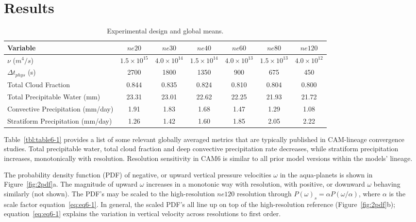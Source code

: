 \section{Results}

 \begin{table}
 \caption{Experimental design and global means.}
 \centering
 \scriptsize
 \begin{tabular}{lcccccc}
   \hline
   Variable & $ne20$ & $ne30$ & $ne40$ & $ne60$ & $ne80$ & $ne120$ \\
   \hline
   $\nu$ ($m^4/s$) & $1.5 \times 10^{15}$ & $4.0 \times 10^{14}$ & $1.5 \times 10^{14}$ & $4.0 \times 10^{13}$  & $1.5 \times 10^{13}$ & $4.0 \times 10^{12}$\\
    $\Delta t_{phys}$ (s) & 2700 & 1800 & 1350 & 900 & 675 & 450 \\
   Total Cloud Fraction & 0.844 & 0.835 & 0.824 & 0.810 & 0.804 & 0.800 \\ 
   Total Precipitable Water (mm) & 23.31& 23.01 & 22.62 & 22.25 & 21.93 & 21.72 \\
   Convective Precipitation (mm/day) & 1.91 & 1.83 & 1.68 & 1.47 & 1.29 & 1.08 \\
   Stratiform Precipitation (mm/day) & 1.26 & 1.42 & 1.60 & 1.85 & 2.05 & 2.22 \\      
 \hline
 \end{tabular}
 \label{tbl:table1}
 \end{table}

Table~\ref{tbl:table6-1} provides a list of some relevant globally averaged metrics that are typically published in CAM-lineage convergence studies. Total precipitable water, total cloud fraction and deep convective precipitation rate decreases, while stratiform precipitation increases, monotonically with resolution. Resolution sensitivity in CAM6 is similar to all prior model versions within the models' lineage. 

The probability density function (PDF) of negative, or upward vertical pressure velocities $\omega$ in the aqua-planets is shown in Figure~\ref{fig:2pdf}a. The magnitude of upward $\omega$ increases in a monotonic way with resolution, with positive, or downward $\omega$ behaving similarly (not shown). The PDF's may be scaled to the high-resolution $ne120$ resolution through $P(\omega)_s = \alpha P (\omega / \alpha)$, where $\alpha$ is the scale factor equation~\ref{eq:eq6-1}. In general, the scaled PDF's all line up on top of the high-resolution reference (Figure~\ref{fig:2pdf}b); equation~\ref{eq:eq6-1} explains the variation in vertical velocity across resolutions to first order. 

